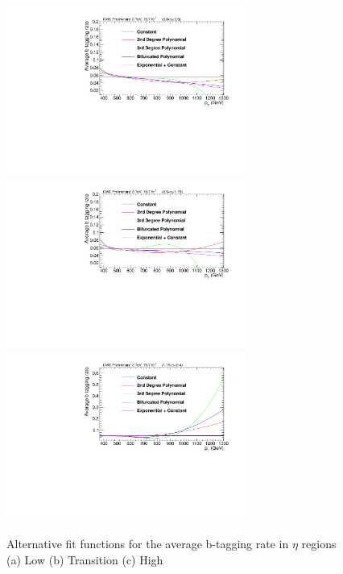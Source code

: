 \begin{figure}[htcb]
\begin{center}
\includegraphics[width=0.7\textwidth]{AN-13-004/figs/BKGFITCOMPLOGE1.pdf}\\
\includegraphics[width=0.7\textwidth]{AN-13-004/figs/BKGFITCOMPLOGE2.pdf}\\
\includegraphics[width=0.7\textwidth]{AN-13-004/figs/BKGFITCOMPLOGE3.pdf}
\caption{
Alternative fit functions for the average b-tagging rate in $\eta$ regions
(a) Low
(b) Transition
(c) High
}
\label{figs:BKGFITCOMP}
\end{center}
\end{figure}

